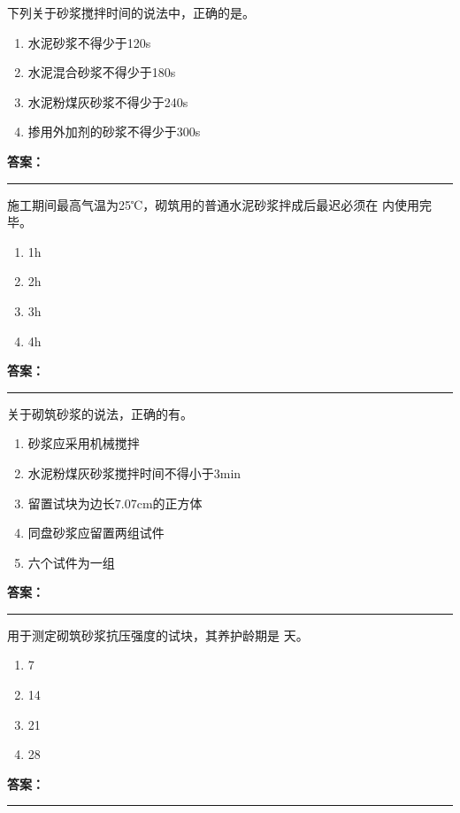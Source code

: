 \documentclass[UTF8,fontset=fandol,11pt]{ctexart}
\newcommand{\answerline}{\textcolor{answerred}{\rule{2.4cm}{0.7pt}}}
\begin{document}
\vspace{0.2em}

\begin{quizbox}[title={第 7 题}]
下列关于砂浆搅拌时间的说法中，正确的是。\\
\begin{enumerate}[label=\Alph*.]
\item 水泥砂浆不得少于120s
\item 水泥混合砂浆不得少于180s
\item 水泥粉煤灰砂浆不得少于240s
\item 掺用外加剂的砂浆不得少于300s
\end{enumerate}
\textbf{\textcolor{answerred}{答案：}} \answerline
\end{quizbox}

\vspace{0.2em}

\begin{quizbox}[title={第 8 题}]
施工期间最高气温为25℃，砌筑用的普通水泥砂浆拌成后最迟必须在 内使用完毕。\\
\begin{enumerate}[label=\Alph*.]
\item 1h
\item 2h
\item 3h
\item 4h
\end{enumerate}
\textbf{\textcolor{answerred}{答案：}} \answerline
\end{quizbox}

\vspace{0.2em}

\begin{quizbox}[title={第 9 题}]
关于砌筑砂浆的说法，正确的有。\\
\begin{enumerate}[label=\Alph*.]
\item 砂浆应采用机械搅拌
\item 水泥粉煤灰砂浆搅拌时间不得小于3min
\item 留置试块为边长7.07cm的正方体
\item 同盘砂浆应留置两组试件
\item 六个试件为一组
\end{enumerate}
\textbf{\textcolor{answerred}{答案：}} \answerline
\end{quizbox}

\vspace{0.2em}

\begin{quizbox}[title={第 10 题}]
用于测定砌筑砂浆抗压强度的试块，其养护龄期是 天。\\
\begin{enumerate}[label=\Alph*.]
\item 7
\item 14
\item 21
\item 28
\end{enumerate}
\textbf{\textcolor{answerred}{答案：}} \answerline
\end{quizbox}
\end{document}
